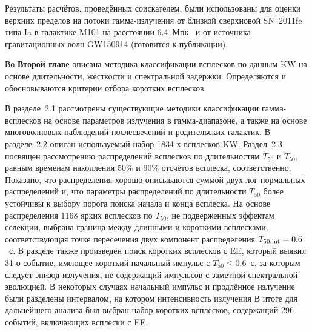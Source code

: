 Результаты расчётов, проведённых соискателем, были использованы для оценки верхних 
пределов на потоки гамма-излучения от близкой сверхновой SN~2011fe типа Ia в 
галактике M101 на расстоянии 6.4~Мпк~\citep{Margutti_2012ApJ} и от источника гравитационных
волн GW150914 (готовится к публикации).

Во \underline{\textbf{Второй главе}} описана методика классификации всплесков 
по данным KW на основе длительности, жесткости и спектральной задержки. 
Определяются и обосновываются критерии отбора коротких всплесков.

В разделе~2.1 рассмотрены существующие методики классификации гамма-всплесков на основе 
параметров излучения в гамма-диапазоне, а также на основе многоволновых наблюдений 
послесвечений и родительских галактик. В разделе~2.2 описан используемый набор 1834-х всплесков KW.
Раздел~2.3 посвящен рассмотрению распределений всплесков по длительностям $T_{50}$ и $T_{50}$, 
равным временам накопления 50\% и 90\% отсчётов всплеска, соответственно. Показано,
что распределения хорошо описываются суммой двух лог-нормальных распределений и, что
параметры распределений по длительности $T_{50}$ более устойчивы к выбору 
порога поиска начала и конца всплеска. На основе распределения 1168 ярких всплесков по $T_{50}$,
не подверженных эффектам селекции, выбрана граница между длинными и  короткими всплесками, 
соответствующая точке пересечения двух компонент распределения $T_{50{\mathrm{,int}}} = 0.6$~с.
В разделе также произведён поиск коротких всплесков с EE, который выявил 31-о
событие, имеющее короткий начальный импульс с $T_{50} \le 0.6$~с, за
которым следует эпизод излучения, не содержащий импульсов с заметной
спектральной эволюцией. В некоторых случаях начальный импульс и продлённое
излучение были разделены интервалом, на котором интенсивность излучения
В итоге для дальнейшего анализа был выбран набор коротких всплесков, содержащий 296 событий, 
включающих всплески с EE.  

